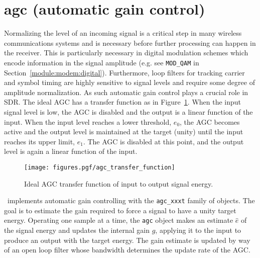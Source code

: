 % 
%

\newpage
\section{agc (automatic gain control)}
\label{module:agc}
Normalizing the level of an incoming signal is a critical step in
many wireless communications systems
and is necessary before further processing can happen in the receiver.
This is particularly necessary in digital
modulation schemes which encode information in the signal amplitude
(e.g. see {\tt MOD\_QAM} in Section~\ref{module:modem:digital}).
Furthermore, loop filters for tracking carrier and symbol timing are highly
sensitive to signal levels and require some degree of amplitude
normalization.
As such automatic gain control plays a crucial role in SDR.
The ideal AGC has a transfer function as in
Figure~\ref{fig:module:agc:transfer_function}.
When the input signal level is low, the AGC is disabled and the output is a
linear function of the input.
When the input level reaches a lower threshold, $e_0$, the AGC becomes active
and the output level is maintained at the target (unity) until the input
reaches its upper limit, $e_1$.
The AGC is disabled at this point, and the output level is again a linear
function of the input.

\begin{figure}
\centering
  \texttt{[image: figures.pgf/agc\_transfer\_function]}
\caption{Ideal AGC transfer function of input to output signal energy.}
\label{fig:module:agc:transfer_function}
\end{figure}

\liquid\ implements automatic gain controlling with the {\tt agc\_xxxt}
family of objects.
The goal is to estimate the gain required to force a signal to have a
unity target energy.
Operating one sample at a time, the {\tt agc} object makes an estimate
$\hat{e}$ of the signal energy and updates the internal gain $g$,
applying it to the input to produce an output with the target energy.
The gain estimate is updated by way of an open loop filter whose bandwidth
determines the update rate of the AGC.

